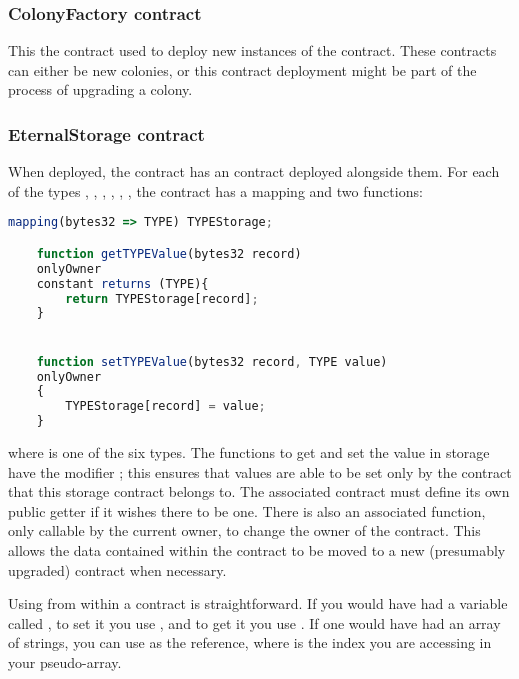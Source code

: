 \subsubsection {ColonyFactory contract}
This the contract used to deploy new instances of the  contract. These contracts can either be new colonies, or this contract deployment might be part of the process of upgrading a colony.

\subsubsection {EternalStorage contract}

When deployed, the   contract has an  contract deployed alongside them. For each of the types , , , , , , the  contract has a mapping and two functions:

\begin{minipage}[c]{0.9\linewidth}
\begin{lstlisting}[language=JavaScript]
    mapping(bytes32 => TYPE) TYPEStorage;

    function getTYPEValue(bytes32 record)
    onlyOwner 
    constant returns (TYPE){
        return TYPEStorage[record];
    }


    function setTYPEValue(bytes32 record, TYPE value)
    onlyOwner
    {
        TYPEStorage[record] = value;
    }
\end{lstlisting}
\end{minipage}

\noindent where  is one of the six types. The functions to get and set the value in storage have the modifier ; this ensures that values are able to be set only by the contract that this storage contract belongs to. The associated contract must define its own public getter if it wishes there to be one. There is also an associated  function, only callable by the current owner, to change the owner of the contract. This allows the data contained within the contract to be moved to a new (presumably upgraded) contract when necessary. 

Using  from within a contract is straightforward. If you would have had a variable called , to set it you use , and to get it you use . If one would have had an array of strings, you can use  as the reference, where  is the index you are accessing in your pseudo-array.

